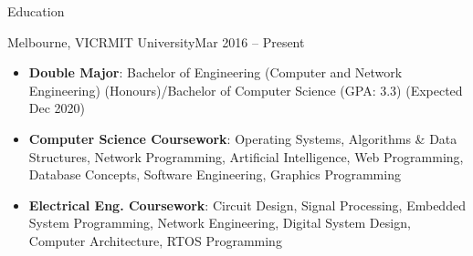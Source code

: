 \documentclass[]{mcdowellcv}
\begin{document}
	\makeheader
	
		
	\begin{cvsection}{Education}
		\begin{cvsubsection}{Melbourne, VIC}{RMIT University}{Mar 2016 -- Present}
			\begin{itemize}
				\item \textbf{Double Major}: Bachelor of Engineering (Computer and Network Engineering) (Honours)/Bachelor of Computer Science (GPA: 3.3) (Expected Dec 2020) 
				\item \textbf{Computer Science Coursework}: Operating Systems, Algorithms \& Data Structures, Network Programming, Artificial Intelligence, Web Programming, Database Concepts, Software Engineering, Graphics Programming
				\item \textbf{Electrical Eng. Coursework}: Circuit Design, Signal Processing, Embedded System Programming, Network Engineering, Digital System Design, Computer Architecture, RTOS Programming
			\end{itemize}
		\end{cvsubsection}
	\end{cvsection}
\end{document}
